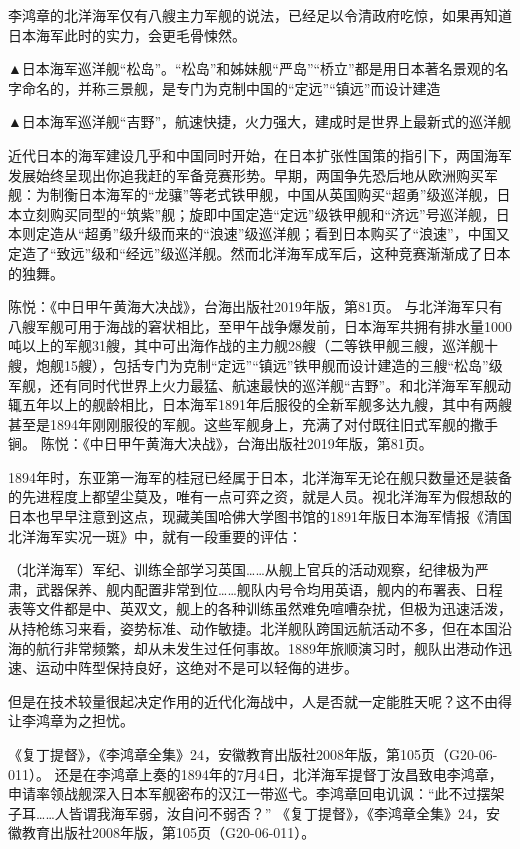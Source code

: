 \documentclass[12pt,UTF8]{ctexbook}
\begin{document}
李鸿章的北洋海军仅有八艘主力军舰的说法，已经足以令清政府吃惊，如果再知道日本海军此时的实力，会更毛骨悚然。


▲日本海军巡洋舰“松岛”。“松岛”和姊妹舰“严岛”“桥立”都是用日本著名景观的名字命名的，并称三景舰，是专门为克制中国的“定远”“镇远”而设计建造


▲日本海军巡洋舰“吉野”，航速快捷，火力强大，建成时是世界上最新式的巡洋舰

近代日本的海军建设几乎和中国同时开始，在日本扩张性国策的指引下，两国海军发展始终呈现出你追我赶的军备竞赛形势。早期，两国争先恐后地从欧洲购买军舰：为制衡日本海军的“龙骧”等老式铁甲舰，中国从英国购买“超勇”级巡洋舰，日本立刻购买同型的“筑紫”舰；旋即中国定造“定远”级铁甲舰和“济远”号巡洋舰，日本则定造从“超勇”级升级而来的“浪速”级巡洋舰；看到日本购买了“浪速”，中国又定造了“致远”级和“经远”级巡洋舰。然而北洋海军成军后，这种竞赛渐渐成了日本的独舞。

陈悦：《中日甲午黄海大决战》，台海出版社2019年版，第81页。
与北洋海军只有八艘军舰可用于海战的窘状相比，至甲午战争爆发前，日本海军共拥有排水量1000吨以上的军舰31艘，其中可出海作战的主力舰28艘（二等铁甲舰三艘，巡洋舰十艘，炮舰15艘），包括专门为克制“定远”“镇远”铁甲舰而设计建造的三艘“松岛”级军舰，还有同时代世界上火力最猛、航速最快的巡洋舰“吉野”。和北洋海军军舰动辄五年以上的舰龄相比，日本海军1891年后服役的全新军舰多达九艘，其中有两艘甚至是1894年刚刚服役的军舰。这些军舰身上，充满了对付既往旧式军舰的撒手锏。 陈悦：《中日甲午黄海大决战》，台海出版社2019年版，第81页。

1894年时，东亚第一海军的桂冠已经属于日本，北洋海军无论在舰只数量还是装备的先进程度上都望尘莫及，唯有一点可弈之资，就是人员。视北洋海军为假想敌的日本也早早注意到这点，现藏美国哈佛大学图书馆的1891年版日本海军情报《清国北洋海军实况一斑》中，就有一段重要的评估：

（北洋海军）军纪、训练全部学习英国……从舰上官兵的活动观察，纪律极为严肃，武器保养、舰内配置非常到位……舰队内号令均用英语，舰内的布署表、日程表等文件都是中、英双文，舰上的各种训练虽然难免喧嘈杂扰，但极为迅速活泼，从持枪练习来看，姿势标准、动作敏捷。北洋舰队跨国远航活动不多，但在本国沿海的航行非常频繁，却从未发生过任何事故。1889年旅顺演习时，舰队出港动作迅速、运动中阵型保持良好，这绝对不是可以轻侮的进步。

但是在技术较量很起决定作用的近代化海战中，人是否就一定能胜天呢？这不由得让李鸿章为之担忧。

《复丁提督》，《李鸿章全集》24，安徽教育出版社2008年版，第105页（G20-06-011）。
还是在李鸿章上奏的1894年的7月4日，北洋海军提督丁汝昌致电李鸿章，申请率领战舰深入日本军舰密布的汉江一带巡弋。李鸿章回电讥讽：“此不过摆架子耳……人皆谓我海军弱，汝自问不弱否？” 《复丁提督》，《李鸿章全集》24，安徽教育出版社2008年版，第105页（G20-06-011）。
\end{document}
